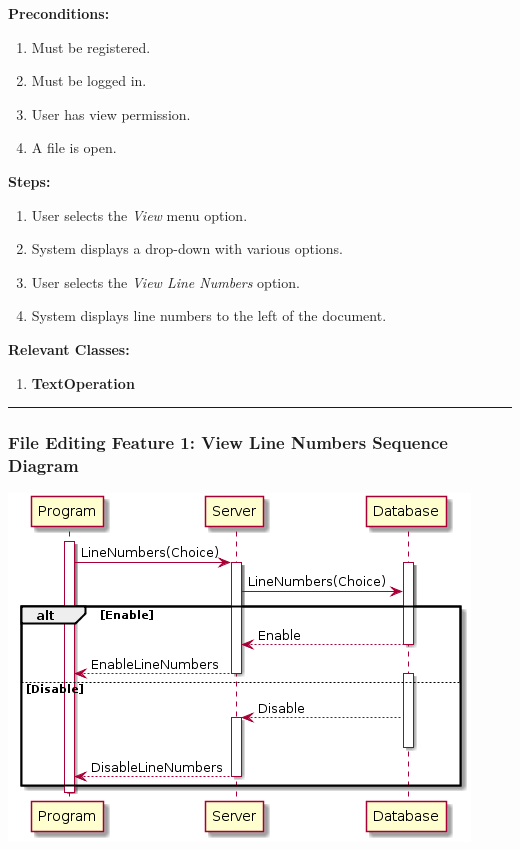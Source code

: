 \documentclass[twoside,letterpaper]{article}
\begin{document}
	\noindent\textbf{Preconditions:}
	\begin{enumerate}
		\item Must be registered.
		\item Must be logged in.
		\item User has view permission.
		\item A file is open.
	\end{enumerate}
	\noindent\textbf{Steps:}
	\begin{enumerate}
		\item User selects the \textit{View} menu option.
		\item System displays a drop-down with various options.
		\item User selects the \textit{View Line Numbers} option.
		\item System displays line numbers to the left of the document.
	\end{enumerate}
	\noindent\textbf{Relevant Classes:}
	\begin{enumerate}
		\item \textbf {TextOperation}

	\end{enumerate}
\vspace{8pt}
\hrule
\newpage

\subsubsection[File Editing Feature 1: View Line Numbers Sequence Diagram]{\rmfamily\bfseries\color{black}
	File Editing Feature 1: View Line Numbers Sequence Diagram}
\hypertarget{RefHeading22059017292}{}

\bigskip

\includegraphics[width=\textwidth]{images/SequenceDiagrams/LineNumbers}
\end{document}
